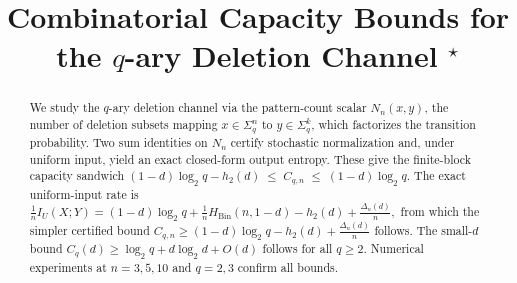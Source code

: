 \documentclass[conference]{IEEEtran}
\begin{document}
\title{Combinatorial Capacity Bounds for the $q$-ary Deletion Channel $^{\star}$}

\author{
  \and
  \and
}

\maketitle

\begin{abstract}
We study the \(q\)-ary deletion channel via the pattern-count scalar
\(N_n(x,y)\), the number of deletion subsets mapping \(x\in\Sigma_q^n\)
to \(y\in\Sigma_q^k\), which factorizes the transition probability.
Two sum identities on \(N_n\) certify stochastic normalization and,
under uniform input, yield an exact closed-form output entropy.
These give the finite-block capacity sandwich
\(
(1-d)\log_2 q-h_2(d)\;\le\; C_{q,n}\;\le\;(1-d)\log_2 q.
\)
The exact uniform-input rate is
\(
\frac{1}{n}I_U(X;Y)
=(1-d)\log_2 q+\frac{1}{n}H_{\mathrm{Bin}}(n,1-d)-h_2(d)+\frac{\Delta_n(d)}{n},
\)
from which the simpler certified bound
\(
C_{q,n}\ge (1-d)\log_2 q-h_2(d)+\frac{\Delta_n(d)}{n}
\)
follows.
The small-\(d\) bound \(C_q(d)\ge\log_2 q+d\log_2 d+O(d)\) follows
for all \(q\ge 2\). Numerical experiments at \(n=3,5,10\) and \(q=2,3\)
confirm all bounds.
\end{abstract}
\end{document}
